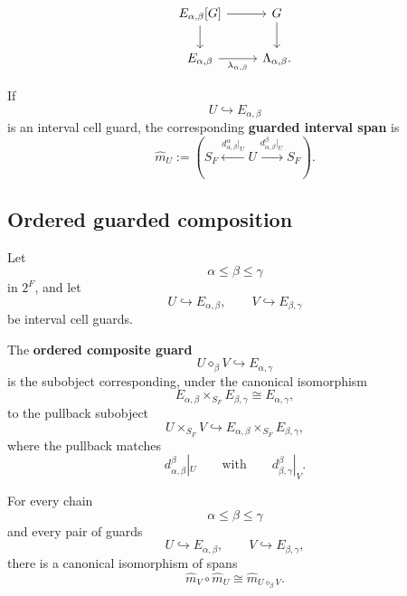 \[
\begin{tikzcd}
E_{\alpha,\beta}[G]
    \arrow[r]
    \arrow[d]
&
G
    \arrow[d]
\\
E_{\alpha,\beta}
    \arrow[r,"\lambda_{\alpha,\beta}"']
&
\Lambda_{\alpha,\beta}.
\end{tikzcd}
\]

\begin{definition}
\label{def:cmett-guarded-interval-span}
    If
    \[
        U\hookrightarrow E_{\alpha,\beta}
    \]
    is an interval cell guard, the corresponding \textbf{guarded interval
    span} is
    \[
        \widehat m_U
        :=
        \left(
            S_F
            \xleftarrow{d_{\alpha,\beta}^{\alpha}|_U}
            U
            \xrightarrow{d_{\alpha,\beta}^{\beta}|_U}
            S_F
        \right).
    \]
\end{definition}

\subsection{Ordered guarded composition}
\label{subsec:cmett-ordered-guarded-composition}

Let
\[
    \alpha\leq\beta\leq\gamma
\]
in \(2^F\), and let
\[
    U\hookrightarrow E_{\alpha,\beta},
    \qquad
    V\hookrightarrow E_{\beta,\gamma}
\]
be interval cell guards.

\begin{definition}
\label{def:cmett-ordered-composite-guard}
    The \textbf{ordered composite guard}
    \[
        U\diamond_\beta V\hookrightarrow E_{\alpha,\gamma}
    \]
    is the subobject corresponding, under the canonical isomorphism
    \[
        E_{\alpha,\beta}
        \times_{S_F}
        E_{\beta,\gamma}
        \cong
        E_{\alpha,\gamma},
    \]
    to the pullback subobject
    \[
        U\times_{S_F}V
        \hookrightarrow
        E_{\alpha,\beta}
        \times_{S_F}
        E_{\beta,\gamma},
    \]
    where the pullback matches
    \[
        d_{\alpha,\beta}^{\beta}|_U
        \qquad\text{with}\qquad
        d_{\beta,\gamma}^{\beta}|_V.
    \]
\end{definition}

\begin{proposition}
\label{prop:cmett-ordered-guarded-interval-composition}
    For every chain
    \[
        \alpha\leq\beta\leq\gamma
    \]
    and every pair of guards
    \[
        U\hookrightarrow E_{\alpha,\beta},
        \qquad
        V\hookrightarrow E_{\beta,\gamma},
    \]
    there is a canonical isomorphism of spans
    \[
        \widehat m_V\circ\widehat m_U
        \cong
        \widehat m_{U\diamond_\beta V}.
    \]
\end{proposition}

